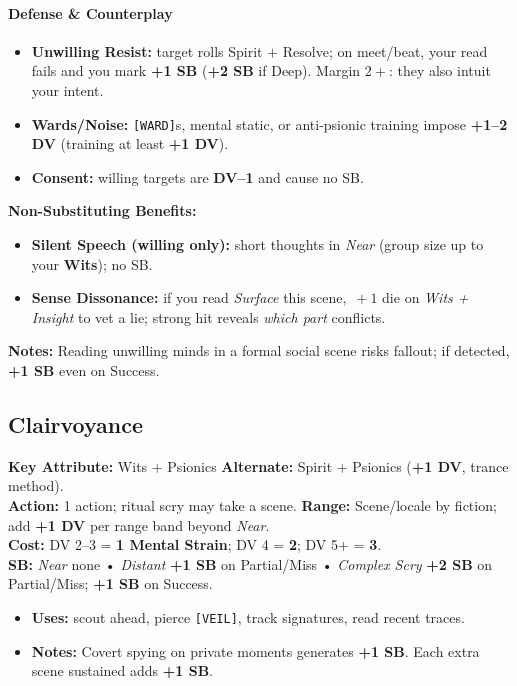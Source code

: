 \documentclass[11pt,twoside]{article}
\begin{document}
\paragraph*{Defense \& Counterplay}
\begin{itemize}[leftmargin=*]
  \item \textbf{Unwilling Resist:} target rolls Spirit $+$ Resolve; on meet/beat, your read fails and you mark \textbf{+1 SB} (\textbf{+2 SB} if Deep). Margin \(2+\): they also intuit your intent.
  \item \textbf{Wards/Noise:} \texttt{[WARD]}s, mental static, or anti-psionic training impose \textbf{+1--2 DV} (training at least \textbf{+1 DV}).
  \item \textbf{Consent:} willing targets are \textbf{DV--1} and cause no SB.
\end{itemize}

\textbf{Non-Substituting Benefits:}
\begin{itemize}[leftmargin=*]
  \item \textbf{Silent Speech (willing only):} short thoughts in \textit{Near} (group size up to your \textbf{Wits}); no SB.
  \item \textbf{Sense Dissonance:} if you read \emph{Surface} this scene, \(\,+1\) die on \emph{Wits + Insight} to vet a lie; strong hit reveals \emph{which part} conflicts.
\end{itemize}
\textbf{Notes:} Reading unwilling minds in a formal social scene risks fallout; if detected, \textbf{+1 SB} even on Success.


\subsection{Clairvoyance}
\textbf{Key Attribute:} Wits $+$ Psionics \quad
\textbf{Alternate:} Spirit $+$ Psionics (\textbf{+1 DV}, trance method). \\
\textbf{Action:} 1 action; ritual scry may take a scene. \quad
\textbf{Range:} Scene/locale by fiction; add \textbf{+1 DV} per range band beyond \textit{Near}. \\
\textbf{Cost:} DV 2--3 = \textbf{1 Mental Strain}; DV 4 = \textbf{2}; DV 5+ = \textbf{3}. \\
\textbf{SB:} \textit{Near} none • \textit{Distant} \textbf{+1 SB} on Partial/Miss • \textit{Complex Scry} \textbf{+2 SB} on Partial/Miss; \textbf{+1 SB} on Success.
\begin{itemize}[leftmargin=*]
  \item \textbf{Uses:} scout ahead, pierce \texttt{[VEIL]}, track signatures, read recent traces.
  \item \textbf{Notes:} Covert spying on private moments generates \textbf{+1 SB}. Each extra scene sustained adds \textbf{+1 SB}.
\end{itemize}
\end{document}
